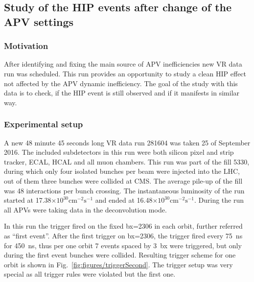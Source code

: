 \subsection{Study of the HIP events after change of the APV settings}

\subsubsection{Motivation}

After identifying and fixing the main source of APV inefficiencies new VR data run was scheduled. This run provides an opportunity to study a clean HIP effect not affected by the APV dynamic inefficiency. The goal of the study with this data is to check, if the HIP event is still observed and if it manifests in similar way.


\subsubsection{Experimental setup}

A new 48 minute 45 seconds long VR data run 281604 was taken 25 of September 2016. The included subdetectors in this run were both silicon pixel and strip tracker, ECAL, HCAL and all muon chambers. This run was part of the fill 5330, during which only four isolated bunches per beam were injected into the LHC, out of them three bunches were collided at CMS. The average pile-up of the fill was 48 interactions per bunch crossing. The instantaneous luminosity of the run started at 17.38$\times 10^{30} \mathrm{cm^{-2} s^{-1}}$ and ended at 16.48$\times 10^{30} \mathrm{cm^{-2} s^{-1}}$. During the run all APVs were taking data in the deconvolution mode. 

In this run the trigger fired on the fixed bx=2306 in each orbit, further referred as ``first event''. After the first trigger on bx=2306, the trigger fired every 75~ns for 450~ns, thus per one orbit 7 events spaced by 3~bx were triggered, but only during the first event bunches were collided. Resulting trigger scheme for one orbit is shown in Fig.~\ref{fig:figures/triggerSecond}. The trigger setup was very special as all trigger rules were violated but the first one.

